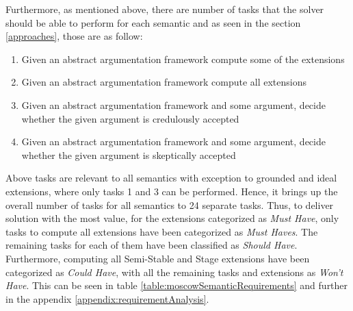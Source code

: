 Furthermore, as mentioned above, there are number of tasks that the solver should be able to perform for each semantic and as seen in the section \ref{approaches}, those are as follow:
\begin{enumerate}
	\item Given an abstract argumentation framework compute some of the extensions
	\item Given an abstract argumentation framework compute all extensions
	\item Given an abstract argumentation framework and some argument, decide whether the given argument is credulously accepted
	\item Given an abstract argumentation framework and some argument, decide whether the given argument is skeptically accepted
\end{enumerate}

Above tasks are relevant to all semantics with exception to grounded and ideal extensions, where only tasks 1 and 3 can be performed. Hence, it brings up the overall number of tasks for all semantics to 24 separate tasks. Thus, to deliver solution with the most value, for the extensions categorized as \textit{Must Have}, only tasks to compute all extensions have been categorized as \textit{Must Haves}. The remaining tasks for each of them have been classified as \textit{Should Have}. Furthermore, computing all Semi-Stable and Stage extensions have been categorized as \textit{Could Have}, with all the remaining tasks and extensions as \textit{Won't Have}. This can be seen in table \ref{table:moscowSemanticRequirements} and further in the appendix \ref{appendix:requirementAnalysis}. 


